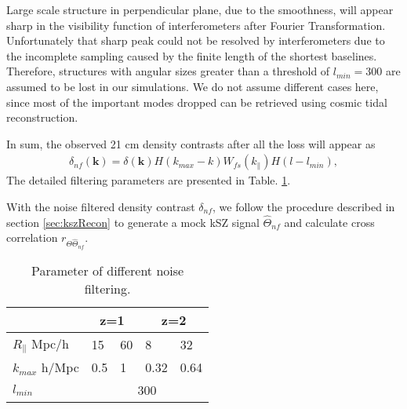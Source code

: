 Large scale structure in perpendicular plane, due to the smoothness, 
will appear sharp in the visibility function of interferometers 
after Fourier Transformation. 
Unfortunately that sharp peak could not be resolved by interferometers 
due to the incomplete sampling  
caused by the finite length of the shortest baselines. 
Therefore, structures with angular sizes greater than a threshold of $l_{min}=300$ 
are assumed to be lost in our simulations. 
We do not assume different cases here, 
since most of the important modes dropped can be retrieved using cosmic tidal reconstruction. 

In sum, the observed 21 cm density contrasts after all the loss will appear as 
\begin{eqnarray}
\label{eq:ns}
    \delta_{nf}(\bm{k})=\delta(\bm{k})H(k_{max}-k)W_{fs}(k_\parallel)H(l-l_{min}),
\end{eqnarray}
The detailed filtering parameters are presented in Table. \ref{tab:para}.

With the noise filtered density contrast $\delta_{nf}$, we follow the procedure described in
section \ref{sec:kszRecon} to generate a mock kSZ signal $\hat \Theta_{nf}$  
and calculate cross correlation $r_{\Theta\hat\Theta_{nf}}$.

\begin{table}
\begin{tabular}{|m{3cm}|m{1cm}|m{1cm}|m{1cm}|m{1cm}|}
    \hline
     & \multicolumn{2}{|c|}{z=1} &\multicolumn{2}{|c|}{z=2}\\
     \hline
     $R_\parallel$  Mpc/h & 15 & 60 & 8 & 32 \\
     \hline
     $k_{max}$ h/Mpc & 0.5 & 1 & 0.32 & 0.64 \\
     \hline
     $l_{min}$ & \multicolumn{4}{|c|}{300} \\
     \hline
\end{tabular}
     \caption{Parameter of different noise filtering.}
     \label{tab:para}
\end{table}
